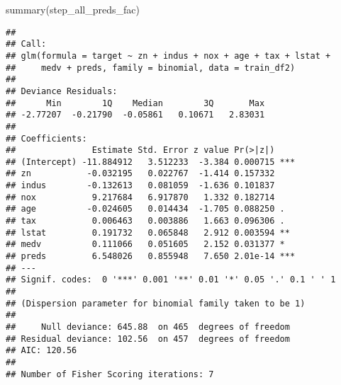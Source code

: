 \documentclass[
]{article}
\newenvironment{Shaded}{\begin{snugshade}}{\end{snugshade}}
\newcommand{\AttributeTok}[1]{\textcolor[rgb]{0.77,0.63,0.00}{#1}}
\newcommand{\CommentTok}[1]{\textcolor[rgb]{0.56,0.35,0.01}{\textit{#1}}}
\newcommand{\DecValTok}[1]{\textcolor[rgb]{0.00,0.00,0.81}{#1}}
\newcommand{\FloatTok}[1]{\textcolor[rgb]{0.00,0.00,0.81}{#1}}
\newcommand{\FunctionTok}[1]{\textcolor[rgb]{0.00,0.00,0.00}{#1}}
\newcommand{\NormalTok}[1]{#1}
\newcommand{\OtherTok}[1]{\textcolor[rgb]{0.56,0.35,0.01}{#1}}
\newcommand{\SpecialCharTok}[1]{\textcolor[rgb]{0.00,0.00,0.00}{#1}}
\newcommand{\StringTok}[1]{\textcolor[rgb]{0.31,0.60,0.02}{#1}}
\begin{document}
\begin{Shaded}
\begin{Highlighting}[]
\FunctionTok{summary}\NormalTok{(step\_all\_preds\_fac)}
\end{Highlighting}
\end{Shaded}

\begin{verbatim}
## 
## Call:
## glm(formula = target ~ zn + indus + nox + age + tax + lstat + 
##     medv + preds, family = binomial, data = train_df2)
## 
## Deviance Residuals: 
##      Min        1Q    Median        3Q       Max  
## -2.77207  -0.21790  -0.05861   0.10671   2.83031  
## 
## Coefficients:
##               Estimate Std. Error z value Pr(>|z|)    
## (Intercept) -11.884912   3.512233  -3.384 0.000715 ***
## zn           -0.032195   0.022767  -1.414 0.157332    
## indus        -0.132613   0.081059  -1.636 0.101837    
## nox           9.217684   6.917870   1.332 0.182714    
## age          -0.024605   0.014434  -1.705 0.088250 .  
## tax           0.006463   0.003886   1.663 0.096306 .  
## lstat         0.191732   0.065848   2.912 0.003594 ** 
## medv          0.111066   0.051605   2.152 0.031377 *  
## preds         6.548026   0.855948   7.650 2.01e-14 ***
## ---
## Signif. codes:  0 '***' 0.001 '**' 0.01 '*' 0.05 '.' 0.1 ' ' 1
## 
## (Dispersion parameter for binomial family taken to be 1)
## 
##     Null deviance: 645.88  on 465  degrees of freedom
## Residual deviance: 102.56  on 457  degrees of freedom
## AIC: 120.56
## 
## Number of Fisher Scoring iterations: 7
\end{verbatim}

\begin{Shaded}
\end{Shaded}
\end{document}
